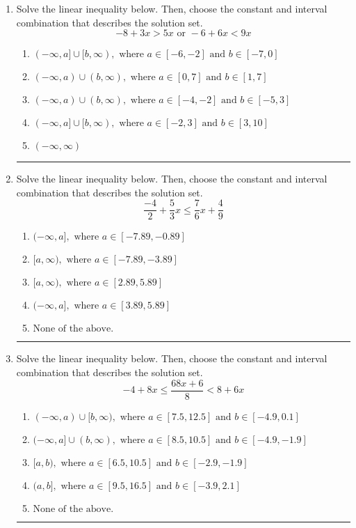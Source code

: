 \documentclass[14pt]{extbook}
\newcommand{\litem}[1]{\item#1\hspace*{-1cm}\rule{\textwidth}{0.4pt}}
\begin{document}
\begin{enumerate}
{\begin{enumerate}[label=\Alph*.]
\end{enumerate} }
\litem{
Solve the linear inequality below. Then, choose the constant and interval combination that describes the solution set.\[ -8 + 3 x > 5 x \text{ or } -6 + 6 x < 9 x \]\begin{enumerate}[label=\Alph*.]
\item \( (-\infty, a] \cup [b, \infty), \text{ where } a \in [-6, -2] \text{ and } b \in [-7, 0] \)
\item \( (-\infty, a) \cup (b, \infty), \text{ where } a \in [0, 7] \text{ and } b \in [1, 7] \)
\item \( (-\infty, a) \cup (b, \infty), \text{ where } a \in [-4, -2] \text{ and } b \in [-5, 3] \)
\item \( (-\infty, a] \cup [b, \infty), \text{ where } a \in [-2, 3] \text{ and } b \in [3, 10] \)
\item \( (-\infty, \infty) \)

\end{enumerate} }
\litem{
Solve the linear inequality below. Then, choose the constant and interval combination that describes the solution set.\[ \frac{-4}{2} + \frac{5}{3} x \leq \frac{7}{6} x + \frac{4}{9} \]\begin{enumerate}[label=\Alph*.]
\item \( (-\infty, a], \text{ where } a \in [-7.89, -0.89] \)
\item \( [a, \infty), \text{ where } a \in [-7.89, -3.89] \)
\item \( [a, \infty), \text{ where } a \in [2.89, 5.89] \)
\item \( (-\infty, a], \text{ where } a \in [3.89, 5.89] \)
\item \( \text{None of the above}. \)

\end{enumerate} }
\litem{
Solve the linear inequality below. Then, choose the constant and interval combination that describes the solution set.\[ -4 + 8 x \leq \frac{68 x + 6}{8} < 8 + 6 x \]\begin{enumerate}[label=\Alph*.]
\item \( (-\infty, a) \cup [b, \infty), \text{ where } a \in [7.5, 12.5] \text{ and } b \in [-4.9, 0.1] \)
\item \( (-\infty, a] \cup (b, \infty), \text{ where } a \in [8.5, 10.5] \text{ and } b \in [-4.9, -1.9] \)
\item \( [a, b), \text{ where } a \in [6.5, 10.5] \text{ and } b \in [-2.9, -1.9] \)
\item \( (a, b], \text{ where } a \in [9.5, 16.5] \text{ and } b \in [-3.9, 2.1] \)
\item \( \text{None of the above.} \)


\end{enumerate}}
\end{enumerate}
\end{document}
